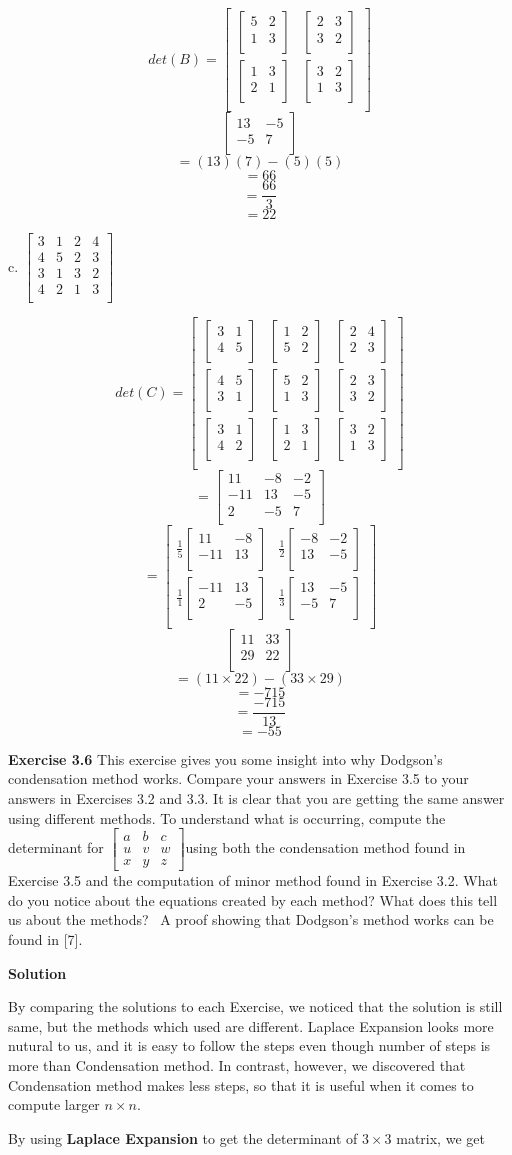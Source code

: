 \documentclass[12pt]{article}
\newcommand{\matxx}[2] {
\begin{bmatrix}
  #1 \\
  #2 \\
\end{bmatrix}
}
\newcommand{\matxxx}[3] {
\begin{bmatrix}
  #1 \\
  #2 \\
  #3 \\
\end{bmatrix}
}
\newcommand{\matxxxx}[4] {
\begin{bmatrix}
  #1 \\
  #2 \\
  #3 \\
  #4 \\
\end{bmatrix}
}
\begin{document}
\[
det(B) =
\matxx
	{\matxx{5&2}{1&3} & \matxx{2&3}{3&2}}
    {\matxx{1&3}{2&1} & \matxx{3&2}{1&3}}
\]
\[
\matxx{13 & -5}
		{-5 & 7}
\]
\[
=(13)(7) - (5)(5)
\]
\[=66\]
\[=\frac{66}{3}\]
\[=22\]

c.
\(
\matxxxx{3&1&2&4}
		{4&5&2&3}
		{3&1&3&2}
        {4&2&1&3}
\)

\[
det(C) =
\matxxx
	{\matxx{3&1}{4&5} & \matxx{1&2}{5&2} & \matxx{2&4}{2&3}}
    {\matxx{4&5}{3&1} & \matxx{5&2}{1&3} & \matxx{2&3}{3&2}}
    {\matxx{3&1}{4&2} & \matxx{1&3}{2&1} & \matxx{3&2}{1&3}}
\]
\[
=
\matxxx
	{11 & -8 & -2}
    {-11 & 13 & -5}
    {2 & -5 & 7}
\]
\[
=
\matxx
	{\frac{1}{5}\matxx{11&-8}{-11&13} & \frac{1}{2}\matxx{-8&-2}{13&-5}}
    {\frac{1}{1}\matxx{-11&13}{2&-5} & \frac{1}{3}\matxx{13&-5}{-5&7}} \]
\[
\matxx{11 & 33}{29 & 22}
\]
\[
=(11 \times 22) - (33 \times 29)
\]
\[
= - 715
\]
\[=\frac{-715}{13}\]
\[=-55\]

\pagebreak

\noindent\textbf{Exercise 3.6} This exercise gives you some insight into why
Dodgson's condensation method works. Compare your answers in Exercise 3.5 to
your answers in Exercises 3.2 and 3.3. It is clear that you are getting the
same answer using different methods. To understand what is occurring, compute
the determinant for $%
\begin{bmatrix}
a & b & c \\
u & v & w \\
x & y & z
\end{bmatrix}
$using both the condensation method found in Exercise 3.5 and the computation
of minor method found in Exercise 3.2. What do you notice about the equations
created by each method? What does this tell us about the methods? \ A proof
showing that Dodgson's method works can be found in [7].

\bigskip

\textbf{Solution}

By comparing the solutions to each Exercise,
we noticed that the solution is still same,
but the methods which used are different.
Laplace Expansion looks more nutural to us,
and it is easy to follow the steps
even though number of steps is more than Condensation method.
In contrast, however, we discovered that Condensation method makes less steps,
so that it is useful when it comes to compute larger \(n \times n\).

\bigskip

By using \textbf{Laplace Expansion} to get the determinant of \(3 \times 3\) matrix, we get
\end{document}
